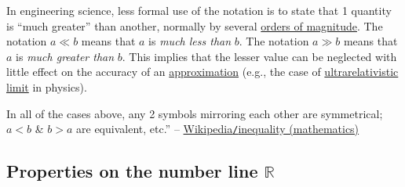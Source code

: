 \documentclass{article}
\begin{document}
In engineering science, less formal use of the notation is to state that 1 quantity is ``much greater'' than another, normally by several \href{https://en.wikipedia.org/wiki/Order_of_magnitude}{orders of magnitude}. The notation $a\ll b$ means that $a$ is \textit{much less than} $b$. The notation $a\gg b$ means that $a$ is \textit{much greater than} $b$. This implies that the lesser value can be neglected with little effect on the accuracy of an \href{https://en.wikipedia.org/wiki/Approximation}{approximation} (e.g., the case of \href{https://en.wikipedia.org/wiki/Ultrarelativistic_limit}{ultrarelativistic limit} in physics).

In all of the cases above, any 2 symbols mirroring each other are symmetrical; $a < b$ \& $b > a$ are equivalent, etc.'' -- \href{https://en.wikipedia.org/wiki/Inequality_(mathematics)}{Wikipedia\texttt{/}inequality (mathematics)}

\subsection{Properties on the number line $\mathbb{R}$}




\printbibliography[heading=bibintoc]
\end{document}
